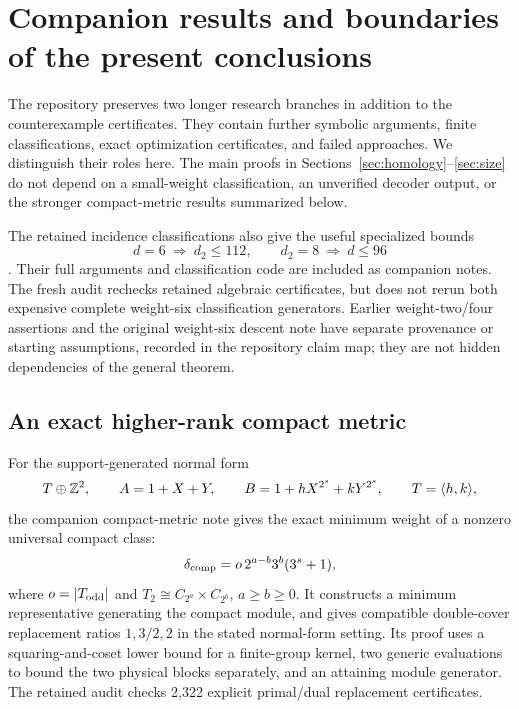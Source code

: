 \section{Companion results and boundaries of the present conclusions}
\label{sec:further}
The repository preserves two longer research branches in addition to the counterexample certificates. They contain further symbolic arguments, finite classifications, exact optimization certificates, and failed approaches. We distinguish their roles here. The main proofs in Sections~\ref{sec:homology}--\ref{sec:size} do not depend on a small-weight classification, an unverified decoder output, or the stronger compact-metric results summarized below.

The retained incidence classifications also give the useful specialized bounds
\[
 d=6\ \Longrightarrow\ d_2\le112,\qquad
 d_2=8\ \Longrightarrow\ d\le96
\]
\cite{WeightSixNote,WeightEightNote}. Their full arguments and classification code are included as companion notes. The fresh audit rechecks retained algebraic certificates, but does not rerun both expensive complete weight-six classification generators. Earlier weight-two/four assertions and the original weight-six descent note have separate provenance or starting assumptions, recorded in the repository claim map; they are not hidden dependencies of the general theorem.

\subsection{An exact higher-rank compact metric}
For the support-generated normal form
\[
 T\oplus\mathbb Z^2,\qquad
 A=1+X+Y,\qquad B=1+hX^{2^s}+kY^{2^s},\qquad T=\langle h,k\rangle,
\]
the companion compact-metric note \cite{CompactNote} gives the exact minimum weight of a nonzero universal compact class:
\begin{equation}\label{eq:compactmetric}
 \delta_{\rm comp}=o\,2^{a-b}3^b(3^s+1),
\end{equation}
where $o=|T_{\rm odd}|$ and $T_2\cong C_{2^a}\times C_{2^b}$, $a\ge b\ge0$. It constructs a minimum representative generating the compact module, and gives compatible double-cover replacement ratios $1,3/2,2$ in the stated normal-form setting. Its proof uses a squaring-and-coset lower bound for a finite-group kernel, two generic evaluations to bound the two physical blocks separately, and an attaining module generator. The retained audit checks 2,322 explicit primal/dual replacement certificates.

